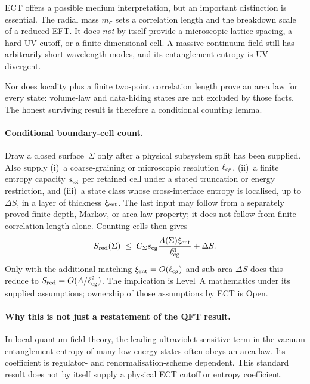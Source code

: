 \documentclass[11pt,a4paper]{article}
\begin{document}
ECT offers a possible medium interpretation, but an important
distinction is essential.  The radial mass $m_\sigma$ sets a
correlation length and the breakdown scale of a reduced EFT.  It does
\emph{not} by itself provide a microscopic lattice spacing, a hard UV
cutoff, or a finite-dimensional cell.  A massive continuum field still
has arbitrarily short-wavelength modes, and its entanglement entropy is
UV divergent.

Nor does locality plus a finite two-point correlation length prove an
area law for every state: volume-law and data-hiding states are not
excluded by those facts.  The honest surviving result is therefore a
conditional counting lemma.

\paragraph{Conditional boundary-cell count.}
Draw a closed surface~$\Sigma$ only after a physical subsystem split
has been supplied.  Also supply (i)~a coarse-graining or microscopic
resolution $\ell_{\rm cg}$, (ii)~a finite entropy capacity
$s_{\rm cg}$ per retained cell under a stated truncation or energy
restriction, and (iii)~a state class whose cross-interface entropy is
localised, up to $\Delta S$, in a layer of thickness $\xi_{\rm ent}$.
The last input may follow from a separately proved finite-depth,
Markov, or area-law property; it does not follow from finite correlation
length alone.  Counting cells then gives
\begin{equation}
  S_{\rm red}(\Sigma)
  \;\le\;
  C_\Sigma s_{\rm cg}
  \frac{A(\Sigma)\xi_{\rm ent}}{\ell_{\rm cg}^{3}}
  +\Delta S.
\end{equation}
Only with the additional matching
$\xi_{\rm ent}=O(\ell_{\rm cg})$ and sub-area $\Delta S$ does this
reduce to $S_{\rm red}=O(A/\ell_{\rm cg}^2)$.  The implication is
Level~A mathematics under its supplied assumptions; ownership of those
assumptions by ECT is Open.

\paragraph{Why this is not just a restatement of the QFT result.}
In local quantum field theory, the leading ultraviolet-sensitive term in the
vacuum entanglement entropy of many low-energy states often obeys an area law.
Its coefficient is regulator- and renormalisation-scheme dependent.  This
standard result does not by itself supply a physical ECT cutoff or entropy
coefficient.
\end{document}
